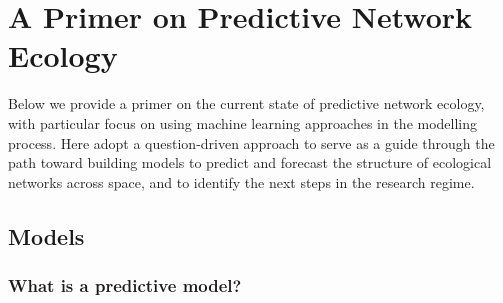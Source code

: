 \documentclass[10pt,oneside]{article}
\begin{document}
\hypertarget{a-primer-on-predictive-network-ecology}{%
\section{A Primer on Predictive Network
Ecology}\label{a-primer-on-predictive-network-ecology}}

Below we provide a primer on the current state of predictive network
ecology, with particular focus on using machine learning approaches in
the modelling process. Here adopt a question-driven approach to serve as
a guide through the path toward building models to predict and forecast
the structure of ecological networks across space, and to identify the
next steps in the research regime.

\hypertarget{models}{%
\subsection{Models}\label{models}}

\hypertarget{what-is-a-predictive-model}{%
\subsubsection{What is a predictive
model?}\label{what-is-a-predictive-model}}
\end{document}
